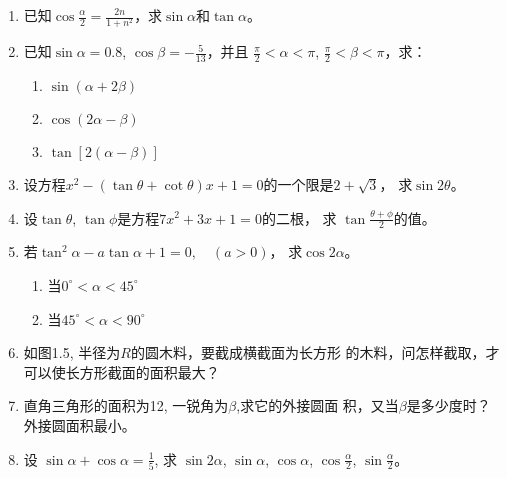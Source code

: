 \begin{enumerate}
\item 已知$\cos\frac{\alpha}{2}=\frac{2n}{1+n^2}$，求$\sin\alpha$和$\tan\alpha$。
\item 已知$\sin\alpha=0.8$, $\cos\beta=-\frac{5}{13}$，并且
$\frac{\pi}{2}<\alpha<\pi$, $\frac{\pi}{2}<\beta<\pi$，求：
\begin{enumerate}
    \item $\sin(\alpha+2\beta)$
    \item $\cos(2\alpha-\beta)$
    \item $\tan[2(\alpha-\beta)]$
\end{enumerate}
\item 设方程$x^2-(\tan \theta+\cot \theta)x+1=0$的一个限是$2+\sqrt{3}$，
求$\sin2\theta$。
\item 设$\tan \theta$, $\tan \phi$是方程$7x^2+3x+1=0$的二根，
求 $\tan\frac{\theta+\phi}{2}$的值。
\item 若$\tan^2 \alpha-a\tan \alpha+1=0,\quad (a>0)$，
求$\cos2\alpha$。
\begin{enumerate}
    \item 当$0^{\circ}<\alpha<45^{\circ}$
    \item 当$45^{\circ}<\alpha<90^{\circ}$
\end{enumerate}

\item 如图1.5, 半径为$R$的圆木料，要截成横截面为长方形
的木料，问怎样截取，才可以使长方形截面的面积最大？
\begin{figure}[htp]
    \centering
{}
    \caption{}
\end{figure}


\item 直角三角形的面积为12, 一锐角为$\beta$,求它的外接圆面
积，又当$\beta$是多少度时？外接圆面积最小。
\item 设 $\sin\alpha +\cos\alpha=\frac{1}{5}$,
求 $\sin2\alpha$, $\sin\alpha$, $\cos\alpha$, $\cos \frac{\alpha}{2}$, $\sin \frac{\alpha}{2}$。


\end{enumerate}
